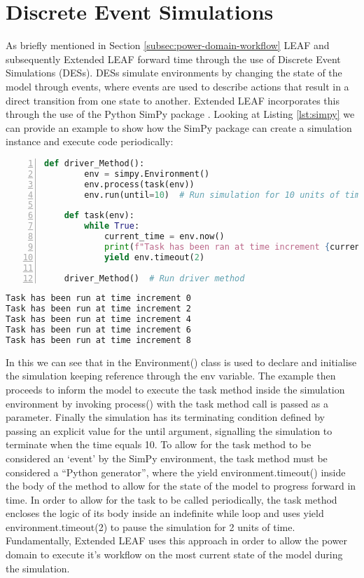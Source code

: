 \documentclass{l4proj}
\begin{document}
\section{Discrete Event Simulations}\label{imp:subsec:des}
As briefly mentioned in Section \ref{subsec:power-domain-workflow} LEAF and subsequently Extended LEAF forward time through the use of Discrete Event Simulations (DESs).
DESs simulate environments by changing the state of the model through events, where events are used to describe actions that result in a direct transition from one state to another.
Extended LEAF incorporates this through the use of the Python SimPy package \cite{simpy}.
Looking at Listing \ref{lst:simpy} we can provide an example to show how the SimPy package can create a simulation instance and execute code periodically:
\begin{lstlisting}[language=python, numbers=left, caption={Example use of the SimPy environment}, label=lst:simpy]
    def driver_Method():
        env = simpy.Environment()
        env.process(task(env))
        env.run(until=10)  # Run simulation for 10 units of time

    def task(env):
        while True:
            current_time = env.now()
            print(f"Task has been ran at time increment {current_time}")
            yield env.timeout(2)

    driver_Method()  # Run driver method
\end{lstlisting}
\begin{lstlisting}[language=TeX, caption={Terminal output of Listing \ref{lst:simpy}}, label=lst:simpy-output]
Task has been run at time increment 0
Task has been run at time increment 2
Task has been run at time increment 4
Task has been run at time increment 6
Task has been run at time increment 8
\end{lstlisting}

In this we can see that in the Environment() class is used to declare and initialise the simulation keeping reference through the env variable.
The example then proceeds to inform the model to execute the task method inside the simulation environment by invoking process() with the task method call is passed as a parameter.
Finally the simulation has its terminating condition defined by passing an explicit value for the until argument, signalling the simulation to terminate when the time equals 10.
To allow for the task method to be considered an `event' by the SimPy environment, the task method must be considered a ``Python generator'', where the yield environment.timeout() inside the body of the method to allow for the state of the model to progress forward in time.
In order to allow for the task to be called periodically, the task method encloses the logic of its body inside an indefinite while loop and uses yield environment.timeout(2) to pause the simulation for 2 units of time.
Fundamentally, Extended LEAF uses this approach in order to allow the power domain to execute it's workflow on the most current state of the model during the simulation.
\end{document}
